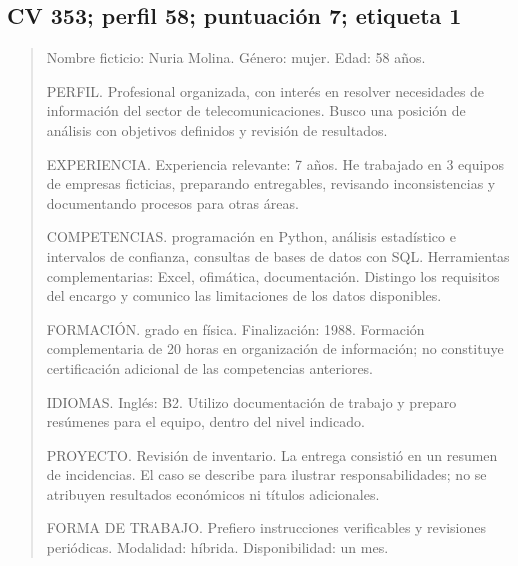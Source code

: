 \documentclass[11pt,a4paper,oneside]{report}
\begin{document}
\subsection*{CV 353; perfil 58; puntuación 7; etiqueta 1}
\begin{quote}\small Nombre ficticio: Nuria Molina. Género: mujer. Edad: 58 años.\par PERFIL. Profesional organizada, con interés en resolver necesidades de información del sector de telecomunicaciones. Busco una posición de análisis con objetivos definidos y revisión de resultados.\par \par EXPERIENCIA. Experiencia relevante: 7 años. He trabajado en 3 equipos de empresas ficticias, preparando entregables, revisando inconsistencias y documentando procesos para otras áreas.\par \par COMPETENCIAS. programación en Python, análisis estadístico e intervalos de confianza, consultas de bases de datos con SQL. Herramientas complementarias: Excel, ofimática, documentación. Distingo los requisitos del encargo y comunico las limitaciones de los datos disponibles.\par \par FORMACIÓN. grado en física. Finalización: 1988. Formación complementaria de 20 horas en organización de información; no constituye certificación adicional de las competencias anteriores.\par \par IDIOMAS. Inglés: B2. Utilizo documentación de trabajo y preparo resúmenes para el equipo, dentro del nivel indicado.\par \par PROYECTO. Revisión de inventario. La entrega consistió en un resumen de incidencias. El caso se describe para ilustrar responsabilidades; no se atribuyen resultados económicos ni títulos adicionales.\par \par FORMA DE TRABAJO. Prefiero instrucciones verificables y revisiones periódicas. Modalidad: híbrida. Disponibilidad: un mes.
\end{quote}
\end{document}

